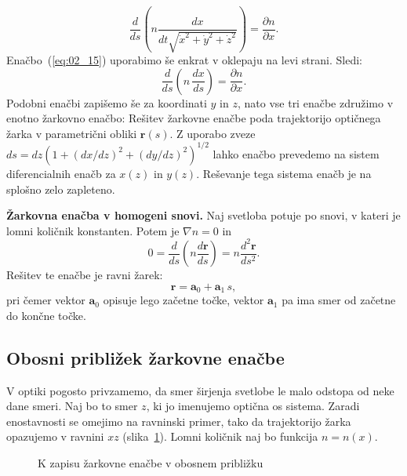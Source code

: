 \begin{equation}
 \frac{d}{ds} \left( n \frac{dx}{dt\sqrt{\dot{x}^2+ \dot{y}^2+\dot{z}^2}} \right)=
 \frac{\partial n}{\partial x}.
 \label{eq:02_16}
\end{equation}
Enačbo~(\ref{eq:02_15}) uporabimo še enkrat v oklepaju na levi strani. Sledi:
\begin{equation}
 \frac{d}{ds} \left( n\, \frac{dx}{ds} \right)=
 \frac{\partial n}{\partial x}.
  \label{eq:02_17}
\end{equation}
Podobni enačbi zapišemo še za koordinati $y$ in $z$, nato vse tri enačbe
združimo v enotno žarkovno enačbo:
Rešitev žarkovne enačbe poda trajektorijo optičnega žarka v parametrični 
obliki $\mathbf{r}(s)$. Z uporabo zveze $ds = dz (1+(dx/dz)^2+(dy/dz)^2)^{1/2}$
lahko enačbo prevedemo na sistem diferencialnih enačb za $x(z)$ in $y(z)$. Reševanje
tega sistema enačb je na splošno zelo zapleteno.

\begin{example}
{\bf Žarkovna enačba v homogeni snovi.} Naj svetloba potuje po snovi,
v kateri je lomni količnik konstanten. Potem je $\nabla n = 0$ in 
\begin{equation}
0 = \frac{d}{ds}\left( n \frac{d\mathbf{r}}{ds} \right) = 
n \frac{d^2 \mathbf{r}}{ds^2}.
 \label{eq:02_18}
\end{equation}
Rešitev te enačbe je ravni žarek:
\begin{equation}
 \mathbf{r} = \mathbf{a}_0+\mathbf{a}_1\,s,
  \label{eq:02_19}
\end{equation}
pri čemer vektor $\mathbf{a}_0$ opisuje lego začetne točke, 
vektor $\mathbf{a}_1$ pa ima smer od začetne do končne točke.
\end{example}

\subsection*{Obosni približek žarkovne enačbe}
V optiki pogosto privzamemo, da smer širjenja svetlobe le malo 
odstopa od neke dane smeri. Naj bo to smer $z$, ki jo imenujemo
optična os sistema. Zaradi enostavnosti se omejimo na ravninski primer, 
tako da trajektorijo žarka opazujemo v ravnini $xz$ 
(slika~\ref{fig:02_FerOs}). Lomni količnik naj bo funkcija $n= n(x)$.
\begin{figure}[ht]
\centering
\def\svgwidth{90truemm} 

\caption{K zapisu žarkovne enačbe v obosnem približku}
\label{fig:02_FerOs}
\end{figure}

